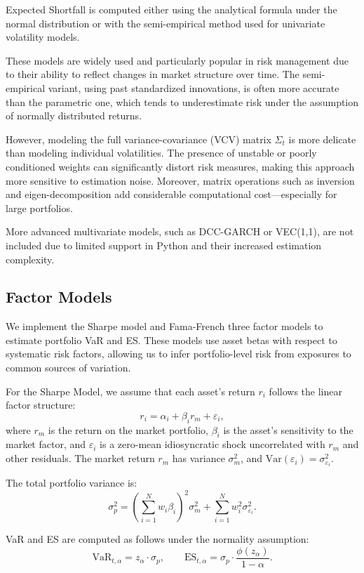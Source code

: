 \documentclass[12pt]{article}
\begin{document}
Expected Shortfall is computed either using the analytical formula under the normal distribution or with the semi-empirical method used for univariate volatility models.

These models are widely used and particularly popular in risk management due to their ability to reflect changes in market structure over time. The semi-empirical variant, using past standardized innovations, is often more accurate than the parametric one, which tends to underestimate risk under the assumption of normally distributed returns.

However, modeling the full variance-covariance (VCV) matrix \( \Sigma_t \) is more delicate than modeling individual volatilities. The presence of unstable or poorly conditioned weights can significantly distort risk measures, making this approach more sensitive to estimation noise. Moreover, matrix operations such as inversion and eigen-decomposition add considerable computational cost—especially for large portfolios.

More advanced multivariate models, such as DCC-GARCH or VEC(1,1), are not included due to limited support in Python and their increased estimation complexity.




\subsection{Factor Models}

We implement the Sharpe model and Fama-French three factor models to estimate portfolio VaR and ES. These models use asset betas with respect to systematic risk factors, allowing us to infer portfolio-level risk from exposures to common sources of variation.

For the Sharpe Model, we assume that each asset’s return $r_i$ follows the linear factor structure:
\[
r_i = \alpha_i + \beta_i r_m + \varepsilon_i,
\]
where $r_m$ is the return on the market portfolio, $\beta_i$ is the asset's sensitivity to the market factor, and $\varepsilon_i$ is a zero-mean idiosyncratic shock uncorrelated with $r_m$ and other residuals. The market return $r_m$ has variance $\sigma_m^2$, and $\mathrm{Var}(\varepsilon_i) = \sigma_{\varepsilon_i}^2$.

The total portfolio variance is:
\[
\sigma_p^2 = \left(\sum_{i=1}^N w_i \beta_i\right)^2 \sigma_m^2 + \sum_{i=1}^N w_i^2 \sigma_{\varepsilon_i}^2.
\]

VaR and ES are computed as follows under the normality assumption:
\[
\text{VaR}_{t,\alpha} = z_\alpha \cdot \sigma_p, \qquad
\text{ES}_{t,\alpha} = \sigma_p \cdot \frac{\phi(z_\alpha)}{1 - \alpha}.
\]
\end{document}
